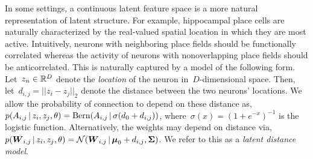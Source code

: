 In some settings, a continuous latent feature space is a more natural representation of latent structure. 
For example, hippocampal place cells are naturally characterized by the real-valued spatial location in which they are most active. 
Intuitively, neurons with neighboring place fields should be functionally correlated whereas the activity of neurons with nonoverlapping place fields should be anticorrelated.
This is naturally captured by a model of the following form.
Let~$z_n \in \mathbb{R}^D$ denote the \emph{location} of the neuron in~$D$-dimensional space. 
Then, let~${d_{i,j} = ||z_i - z_j||_2}$ denote the distance between the two neurons' locations.
We allow the probability of connection to depend on these distance as,
${p(A_{i,j} \,|\, z_i, z_j, \theta) = \mathrm{Bern}(A_{i,j} \,|\, \sigma(d_0 + d_{i,j}))}$,
where~${\sigma(x)=(1+e^{-x})^{-1}}$ is the logistic function.
Alternatively, the weights may depend on distance via,
${p(\boldsymbol{W}_{i,j} \,|\, z_i, z_j, \theta) = \mathcal{N}(\boldsymbol{W}_{i,j} \,|\, \boldsymbol{\mu}_0 + d_{i,j}, \boldsymbol{\Sigma})}$.
We refer to this as a \emph{latent distance model}.

